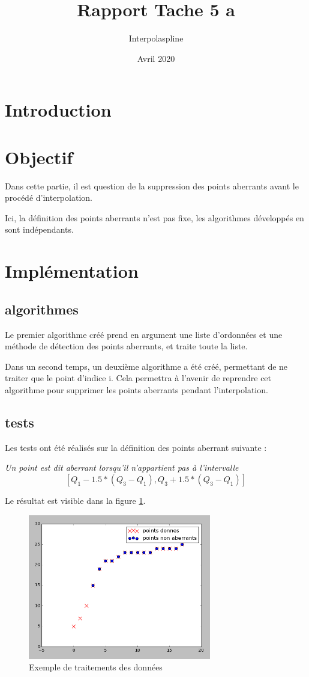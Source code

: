 \documentclass[a4paper,12pt]{article} %
\title{Rapport Tache 5 a}
\author{Interpolaspline}
\date{Avril 2020}
\begin{document}
\maketitle

\section{Introduction}

\section{Objectif}

Dans cette partie, il est question de la suppression des points aberrants avant le procédé d'interpolation.

Ici, la définition des points aberrants n'est pas fixe, les algorithmes développés en sont indépendants.

\section{Implémentation}

\subsection{algorithmes}

Le premier algorithme créé prend en argument une liste d'ordonnées et une méthode de détection des points aberrants, et traite toute la liste.

Dans un second temps, un deuxième algorithme a été créé, permettant de ne traiter que le point d'indice i. Cela permettra à l'avenir de reprendre cet algorithme pour supprimer les points aberrants pendant l'interpolation.

\subsection{tests}

Les tests ont été réalisés sur la définition des points aberrant suivante :

\emph{Un point est dit aberrant lorsqu'il n'appartient pas à l'intervalle }
\[[Q_1 - 1.5*(Q_3 - Q_1) , Q_3 +1.5*(Q_3 - Q_1)]\]

Le résultat est visible dans la figure \ref{suppr}.


\begin{figure}
\begin{center}
\includegraphics[width=8cm]{tache5a.png} 
\end{center}
\caption{Exemple de traitements des données}
\label{suppr}
\end{figure}
\end{document}
